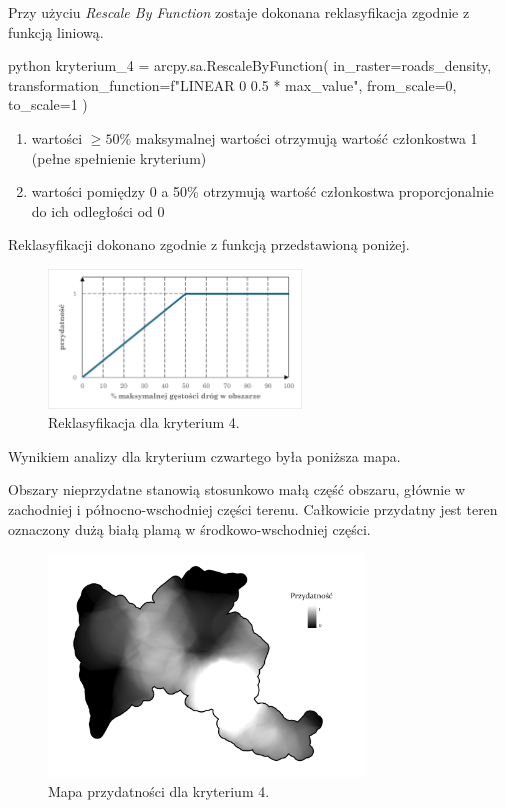 \documentclass{article}
\begin{document}
Przy użyciu \textit{Rescale By Function} zostaje dokonana reklasyfikacja zgodnie z funkcją liniową.
\vspace{5pt}

\begin{mintedbox}{python}
kryterium_4 = arcpy.sa.RescaleByFunction(
    in_raster=roads_density,
    transformation_function=f"LINEAR 0 {0.5 * max_value}",
    from_scale=0,
    to_scale=1   
)
\end{mintedbox}

\begin{enumerate}[label=•]
    \item wartości \( \geq 50\% \) maksymalnej wartości otrzymują wartość członkostwa 1 (pełne spełnienie kryterium)
    \item wartości pomiędzy 0 a 50\% otrzymują wartość członkostwa proporcjonalnie do ich odległości od 0
\end{enumerate}
\vspace{5pt}
\vspace{10pt}

Reklasyfikacji dokonano zgodnie z funkcją przedstawioną poniżej.
\vspace{5pt}

\begin{figure}[H]
    \centering
    \includegraphics[width=0.6\textwidth]{img/kryterium4-wykres-glowny.png}
    \caption{Reklasyfikacja dla kryterium 4.}
\end{figure}
\vspace{10pt}

Wynikiem analizy dla kryterium czwartego była poniższa mapa.

Obszary nieprzydatne stanowią stosunkowo małą część obszaru, głównie w zachodniej i północno-wschodniej części terenu. Całkowicie przydatny jest teren oznaczony dużą białą plamą w środkowo-wschodniej części.

\begin{figure}[H]
    \centering
    \includegraphics[width=0.75\textwidth]{img/kryterium4-layout.jpg}
    \caption{Mapa przydatności dla kryterium 4.}
\end{figure}
\end{document}
